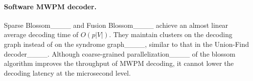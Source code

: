 \paragraph{Software MWPM decoder.}
Sparse Blossom____ and Fusion Blossom____ achieve an almost linear average decoding time of $O(p |V|)$.
They maintain clusters on the decoding graph instead of on the syndrome graph____, similar to that in the Union-Find decoder____.
Although coarse-grained parallelization____ of the blossom algorithm improves the throughput of MWPM decoding, it cannot lower the decoding latency at the microsecond level.